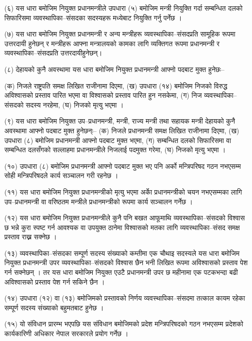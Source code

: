 (६) यस धारा बमोजिम नियुक्त प्रधानमन्त्रीले उपधारा (५) बमोजिम मन्त्री नियुक्ति गर्दा सम्बन्धित दलको सिफारिसमा व्यवस्थापिका–संसदका सदस्यहरू मध्येबाट नियुक्ति गर्नु पर्नेछ ।

(७) यस धारा बमोजिम नियुक्त प्रधानमन्त्री र अन्य मन्त्रीहरू व्यवस्थापिका–संसदप्रति सामूहिक रूपमा उत्तरदायी हुनेछन् र मन्त्रीहरू आफ्ना मन्त्रालयको कामका लागि व्यक्तिगत रूपमा प्रधानमन्त्री र व्यवस्थापिका–संसदप्रति उत्तरदायीहुनेछन्।

(८) देहायको कुनै अवस्थामा यस धारा बमोजिम नियुक्त प्रधानमन्त्री आफ्नो पदबाट मुक्त हुनेछः–

(क) निजले राष्ट्रपति समक्ष लिखित राजीनामा दिएमा,
(ख) उपधारा (१४) बमोजिम निजको विरुद्ध अविश्वासको प्रस्ताव पारित भएमा वा विश्वासको प्रस्ताव पारित हुन नसकेमा,
(ग) निज व्यवस्थापिका–संसदको सदस्य नरहेमा,
(घ) निजको मृत्यु भएमा ।

(९) यस धारा बमोजिम नियुक्त उप–प्रधानमन्त्री, मन्त्री, राज्य मन्त्री तथा सहायक मन्त्री देहायको कुनै अवस्थामा आफ्नो पदबाट मुक्त हुनेछन्ः–
(क) निजले प्रधानमन्त्री समक्ष लिखित राजीनामा दिएमा,
(ख) उपधारा (८) बमोजिम प्रधानमन्त्री आफ्नो पदबाट मुक्त भएमा,
(ग) सम्बन्धित दलको सिफारिसमा वा सम्बन्धित दलसँगको सल्लाहमा प्रधानमन्त्रीले निजलाई पदमुक्त गरेमा,
(घ) निजको मृत्यु भएमा ।

(१०) उपधारा (८) बमोजिम प्रधानमन्त्री आफ्नो पदबाट मुक्त भए पनि अर्को मन्त्रिपरिषद गठन नभएसम्म सोही मन्त्रिपरिषदले कार्य सञ्चालन गरी रहनेछ ।

(११) यस धारा बमोजिम नियुक्त प्रधानमन्त्रीको मृत्यु भएमा अर्काे प्रधानमन्त्रीको चयन नभएसम्मका लागि उप–प्रधानमन्त्री वा वरिष्ठतम मन्त्रीले प्रधानमन्त्रीको रूपमा कार्य सञ्चालन गर्नेछ ।

(१२) यस धारा बमोजिम नियुक्त प्रधानमन्त्रीले कुनै पनि बखत आफूमाथि व्यवस्थापिका–संसदको विश्वास छ भन्ने कुरा स्पष्ट गर्न आवश्यक वा उपयुक्त ठानेमा विश्वासको मतका लागि व्यवस्थापिका–संसद समक्ष प्रस्ताव राख्न सक्नेछ ।

(१३) व्यवस्थापिका–संसदका सम्पूर्ण सदस्य संख्याको कम्तीमा एक चौथाइ सदस्यले यस धारा बमोजिम नियुक्त प्रधानमन्त्री उपर व्यवस्थापिका–संसदको विश्वास छैन भनी लिखित रूपमा अविश्वासको प्रस्ताव पेश गर्न सक्नेछन् ।
तर यस धारा बमोजिम नियुक्त एउटै प्रधानमन्त्री उपर छ महीनामा एक पटकभन्दा बढी अविश्वासको प्रस्ताव पेश गर्न सकिने छैन ।

(१४) उपधारा (१२) वा (१३) बमोजिमको प्रस्तावको निर्णय व्यवस्थापिका–संसदमा तत्काल कायम रहेका सम्पूर्ण सदस्य संख्याको बहुमतबाट हुनेछ ।

(१५) यो संविधान प्रारम्भ भएपछि यस संविधान बमोजिमको प्रदेश मन्त्रिपरिषदको गठन नभएसम्म प्रदेशको कार्यकारिणी अधिकार नेपाल सरकारले प्रयोग गर्नेछ ।

